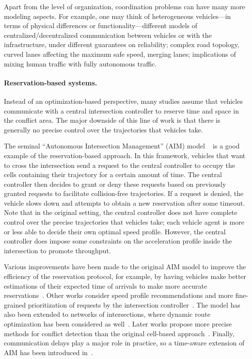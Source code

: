 \documentclass[a4paper]{report}
\theoremstyle{definition}
\theoremstyle{plain}
\begin{document}
%
Apart from the level of organization, coordination problems can have many more
modeling aspects. For example, one may think of heterogeneous vehicles---in
terms of physical differences or functionality---different models of
centralized/decentralized communication between vehicles or with the
infrastructure, under different guarantees on reliability; complex road
topology, curved lanes affecting the maximum safe speed, merging lanes;
implications of mixing human traffic with fully autonomous traffic.


\paragraph{Reservation-based systems.}

Instead of an optimization-based perspective, many studies assume that
vehicles communicate with a central intersection controller to reserve time and
space in the conflict area.
%
The major downside of this line of work is that there is generally no precise
control over the trajectories that vehicles take.

The seminal ``Autonomous Intersection Management'' (AIM) model ~\cite{dresnerMultiagentTrafficManagement2004,dresnerMultiagentApproachAutonomous2008} is a
good example of the reservation-based approach.
%
In this framework, vehicles that want to cross the intersection send a request
to the central controller to occupy the cells containing their trajectory for a
certain amount of time. The central controller then decides to grant or deny
these requests based on previously granted requests to facilitate collision-free
trajectories. If a request is denied, the vehicle slows down and attempts to
obtain a new reservation after some timeout.
%
Note that in the original setting, the central controller does not have complete
control over the precise trajectories that vehicles take; each vehicle agent is
more or less able to decide their own optimal speed profile.
%
However, the central controller does impose some constraints on the acceleration
profile inside the intersection to promote throughput.

Various improvements have been made to the original AIM model to improve the
efficiency of the reservation protocol, for example, by having vehicles make
better estimations of their expected time of arrivals to make more accurate
reservations~\cite{auMotionPlanningAlgorithms2010}.
%
Other works consider speed profile recommendations and more fine-grained
prioritization of requests by the intersection
controller~\cite{huangAssessingMobilityEnvironmental2012}.
%
The model has also been extended to networks of intersections, where dynamic
route optimization has been considered as well~\cite{hausknechtAutonomousIntersectionManagement2011}.
%
Later works propose more precise methods for conflict detection than the
original cell-based approach~\cite{levinConflictpointFormulationIntersection2017,liTemporalspatialDimensionExtensionbased2019}.
%
Finally, communication delays play a major role in practice, so a time-aware
extension of AIM has been introduced
in~\cite{khayatianCrossroadsTimeawareApproach2020}.
\end{document}
